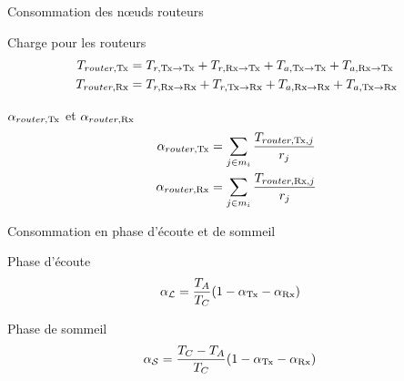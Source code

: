 \begin{frame}{Consommation des nœuds routeurs}
  \begin{block}{Charge pour les routeurs}
    \begin{align}
      T_{router, \textrm{Tx}} &= T_{r, \textrm{Tx} \to \textrm{Tx}} + T_{r, \textrm{Rx} \to \textrm{Tx}} + T_{a, \textrm{Tx} \to \textrm{Tx}} + T_{a, \textrm{Rx} \to \textrm{Tx}}\\
      T_{router, \textrm{Rx}} &= T_{r, \textrm{Rx} \to \textrm{Rx}} + T_{r, \textrm{Tx} \to \textrm{Rx}} + T_{a, \textrm{Rx} \to \textrm{Rx}} + T_{a, \textrm{Tx} \to \textrm{Rx}}
    \end{align}
  \end{block}
  \begin{alertblock}{$\alpha_{router, \textrm{Tx}}$ et $\alpha_{router, \textrm{Rx}}$}
    \begin{align}
      \alpha_{router, \textrm{Tx}} &= \sum_{j \in m_i} \frac{T_{router, \textrm{Tx}, j}}{r_j}
      \label{contikimac:eq:router_tx}\\
      \alpha_{router, \textrm{Rx}} &= \sum_{j \in m_i} \frac{T_{router, \textrm{Rx}, j}}{r_j}
      \label{contikimac:eq:router_rx}
    \end{align}
  \end{alertblock}
\end{frame}

\begin{frame}{Consommation en phase d'écoute et de sommeil}
  \begin{alertblock}{Phase d'écoute}
    \begin{align}
      \alpha_{\mathcal{L}} &= \frac{T_{A}}{T_{C}}(1 - \alpha_{\textrm{Tx}} - \alpha_{\textrm{Rx}})
    \end{align}
  \end{alertblock}
  \begin{alertblock}{Phase de sommeil}
    \begin{align}
      \alpha_{\mathcal{S}} &= \frac{T_{C} - T_{A}}{T_{C}}(1 - \alpha_{\textrm{Tx}} - \alpha_{\textrm{Rx}})
    \end{align}
  \end{alertblock}
\end{frame}

